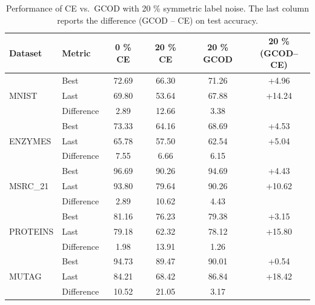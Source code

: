 \begin{table}[htbp]
\centering
    \caption{Performance of CE vs.\ GCOD with 20 \% symmetric label noise.
      The last column reports the difference (GCOD – CE) on test accuracy.}
    \label{tab:alldataset}

    \begin{adjustbox}{width=0.55\linewidth}
      \begin{tabular}{llcccc}
        \hline
        \textbf{Dataset} & \textbf{Metric} &
        \textbf{0 \% CE} & \textbf{20 \% CE} & \textbf{20 \% GCOD} &
        \makecell[c]{20 \%\\(GCOD–CE)} \\ \hline

        \multirow{3}{*}{MNIST}
          & Best       & 72.69 & 66.30 & 71.26 & +4.96 \\
          & Last       & 69.80 & 53.64 & 67.88 & +14.24 \\ \cline{3-5}
          & Difference & 2.89  & 12.66 & 3.38  &        \\ \hline

        \multirow{3}{*}{ENZYMES}
          & Best       & 73.33 & 64.16 & 68.69 & +4.53 \\
          & Last       & 65.78 & 57.50 & 62.54 & +5.04 \\ \cline{3-5}
          & Difference & 7.55  & 6.66  & 6.15  &        \\ \hline

        \multirow{3}{*}{MSRC\_21}
          & Best       & 96.69 & 90.26 & 94.69 & +4.43 \\
          & Last       & 93.80 & 79.64 & 90.26 & +10.62 \\ \cline{3-5}
          & Difference & 2.89  & 10.62 & 4.43  &        \\ \hline

        \multirow{3}{*}{PROTEINS}
          & Best       & 81.16 & 76.23 & 79.38 & +3.15 \\
          & Last       & 79.18 & 62.32 & 78.12 & +15.80 \\ \cline{3-5}
          & Difference & 1.98  & 13.91 & 1.26  &        \\ \hline

        \multirow{3}{*}{MUTAG}
          & Best       & 94.73 & 89.47 & 90.01 & +0.54 \\
          & Last       & 84.21 & 68.42 & 86.84 & +18.42 \\ \cline{3-5}
          & Difference & 10.52 & 21.05 & 3.17 &        \\ \hline


\end{tabular}
\end{adjustbox}
\end{table}
